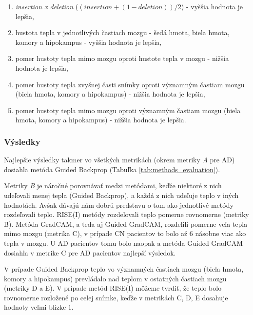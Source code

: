 \begin{enumerate}[label=\Alph*]
    \item \textit{insertion x deletion} ($(insertion + (1 - deletion)) / 2$) - vyššia hodnota je lepšia,
    \item hustota tepla v jednotlivých častiach mozgu - šedá hmota, biela hmota, komory a hipokampus - vyššia hodnota je lepšia,
    \item pomer hustoty tepla mimo mozgu oproti hustote tepla v mozgu - nižšia hodnota je lepšia,
    \item pomer hustoty tepla zvyšnej časti snímky oproti významným častiam mozgu (biela hmota, komory a hipokampus) - nižšia hodnota je lepšia,
    \item pomer hustoty tepla mimo mozgu oproti významným častiam mozgu (biela hmota, komory a hipokampus) - nižšia hodnota je lepšia.
\end{enumerate}

\subsubsection{Výsledky}

Najlepšie výsledky takmer vo všetkých metrikách (okrem metriky \textit{A} pre AD) dosiahla metóda Guided Backprop (Tabuľka \ref{tab:methods_evaluation}). 

Metriky \textit{B} je náročné porovnávať medzi metódami, keďže niektoré z nich udeľovali menej tepla (Guided Backprop), a každá z nich udeľuje teplo v iných hodnotách. Avšak dávajú nám dobrú predstavu o tom ako jednotlivé metódy rozdeľovali teplo. RISE(I) metódy rozdeľovali teplo pomerne rovnomerne (metriky B). Metóda GradCAM, a teda aj Guided GradCAM, rozdelili pomerne veľa tepla mimo mozgu (metrika C), v prípade CN pacientov to bolo až 6 násobne viac ako tepla v mozgu. U AD pacientov tomu bolo naopak a metóda Guided GradCAM dosiahla v metrike C pre AD pacientov najlepší výsledok.

V prípade Guided Backprop teplo vo významných častiach mozgu (biela hmota, komory a hipokampus) prevládalo nad teplom v ostatných častiach mozgu (metriky D a E). V prípade metód RISE(I) môžeme tvrdiť, že teplo bolo rovnomerne rozložené po celej snímke, keďže v metrikách C, D, E dosahuje hodnoty veľmi blízke $1$. 


